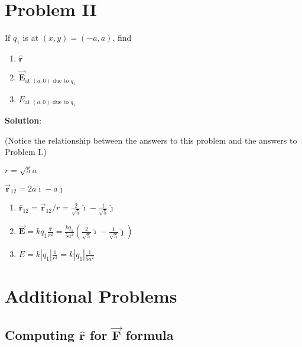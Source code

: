 \documentclass{article}
\newcommand{\ds}[0]{\displaystyle}
\newcommand{\ihat}[0]{\hat{\boldsymbol{\imath}}}
\newcommand{\jhat}[0]{\hat{\boldsymbol{\jmath}}}
\newcommand{\rhat}[0]{\hat{\mathbf{r}}}
\newcommand{\bfvec}[1]{\vec{\mathbf{#1}}}
\begin{document}
\newpage

\section{Problem II}

If $q_1$ is at $(x,y)=(-a,a)$, find 

\begin{enumerate}

  \item $\rhat$

  \item $\bfvec{E}_{\text{at }(a,0)\text{ due to }q_1}$

  \item $E_{\text{at }(a,0)\text{ due to }q_1}$

\end{enumerate}

\ifsolutions
{\bf Solution}:

(Notice the relationship between the answers to this problem and the answers to Problem I.)

$r = \sqrt{5}a$

$\bfvec{r}_{12}=2a\ihat-a\jhat$

    \begin{enumerate}

      \item $\rhat_{12}=\bfvec{r}_{12}/r=\frac{2}{\sqrt{5}}\ihat-\frac{1}{\sqrt{5}}\jhat$

      \item $\ds\bfvec{E}=kq_1\frac{\rhat}{r^2}=\frac{kq_1}{5a^2}\left(\frac{2}{\sqrt{5}}\ihat-\frac{1}{\sqrt{5}}\jhat\right)$

      \item $\ds E = k|q_1|\frac{1}{r^2}= k|q_1|\frac{1}{5a^2}$

    \end{enumerate}
\else


\fi

\newpage

\section{Additional Problems}

\subsection{Computing $\rhat$ for $\bfvec{F}$ formula}
\end{document}
